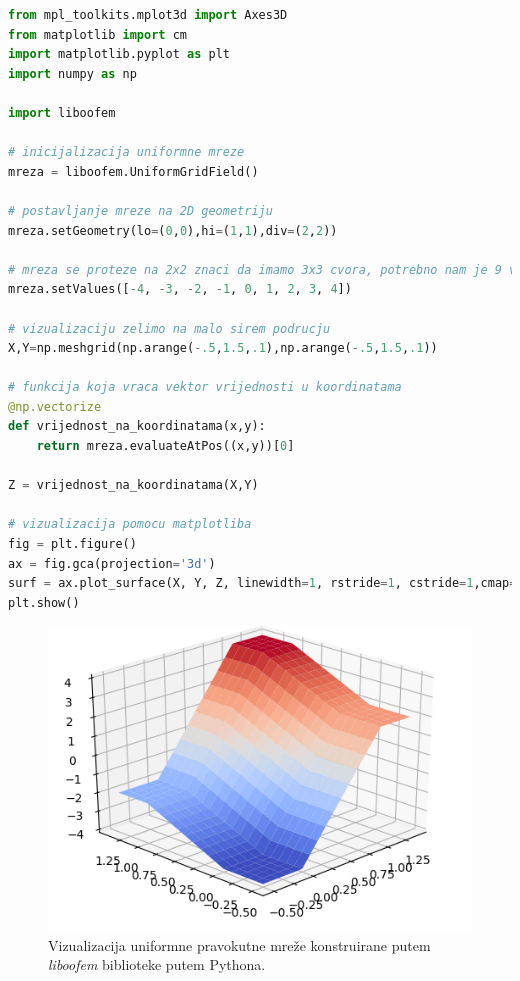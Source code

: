 \documentclass[a4paper,twoside,12pt]{memoir} %
\begin{document}
\begin{lstlisting}[language=python, label={code:python_oofem_matplotlib}, caption={Konstrukcija mrežastog modela i vizualizacija}]
from mpl_toolkits.mplot3d import Axes3D
from matplotlib import cm
import matplotlib.pyplot as plt
import numpy as np

import liboofem

# inicijalizacija uniformne mreze
mreza = liboofem.UniformGridField()

# postavljanje mreze na 2D geometriju
mreza.setGeometry(lo=(0,0),hi=(1,1),div=(2,2))

# mreza se proteze na 2x2 znaci da imamo 3x3 cvora, potrebno nam je 9 vrijednosti
mreza.setValues([-4, -3, -2, -1, 0, 1, 2, 3, 4])

# vizualizaciju zelimo na malo sirem podrucju
X,Y=np.meshgrid(np.arange(-.5,1.5,.1),np.arange(-.5,1.5,.1))

# funkcija koja vraca vektor vrijednosti u koordinatama
@np.vectorize
def vrijednost_na_koordinatama(x,y):
    return mreza.evaluateAtPos((x,y))[0]

Z = vrijednost_na_koordinatama(X,Y)

# vizualizacija pomocu matplotliba
fig = plt.figure()
ax = fig.gca(projection='3d')
surf = ax.plot_surface(X, Y, Z, linewidth=1, rstride=1, cstride=1,cmap=cm.coolwarm, shade=True)
plt.show()
\end{lstlisting}

\begin{figure}[h!t]
\begin{center}
\includegraphics[scale=0.61]{pictures/chapter_oofem/liboofem_mesh_grid.png}
\caption{Vizualizacija uniformne pravokutne mreže konstruirane putem \textit{liboofem} biblioteke putem Pythona.}
\label{fig:visualization_of_mesh_grid_oofem}
\end{center}
\end{figure}
\end{document}
